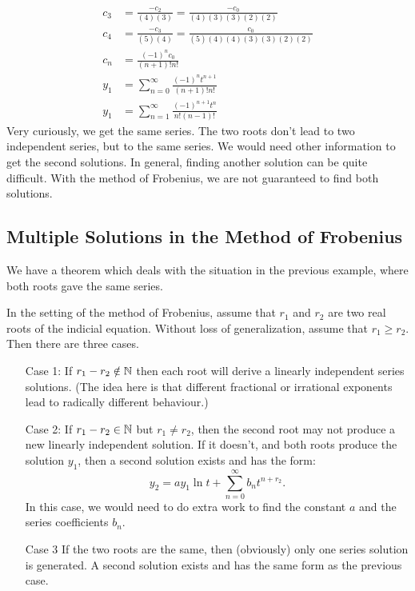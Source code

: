 \documentclass[fleqn,letterpaper]{report}
\begin{document}
\begin{example}
\begin{align*}
c_3 & = \frac{-c_2}{(4)(3)} = \frac{-c_0}{(4)(3)(3)(2)(2)} \\
c_4 & = \frac{-c_3}{(5)(4)} = \frac{c_0}{(5)(4)(4)(3)(3)(2)(2)} \\
c_n & = \frac{(-1)^{n} c_0}{(n+1)! n!} \\
y_1 & = \sum_{n=0}^\infty \frac{(-1)^n t^{n+1}}{(n+1)!n!} \\
y_1 & = \sum_{n=1}^\infty \frac{(-1)^{n+1} t^n}{n!(n-1)!}
\end{align*}
Very curiously, we get the same series. The two roots don't lead to two
independent series, but to the same series. We would need other
information to get the second solutions. In general, finding
another solution can be quite difficult. With the method of
Frobenius, we are not guaranteed to find both solutions.
\end{example}

\subsection{Multiple Solutions in the Method of Frobenius}
\label{frobenius-multiple-solutions}

We have a theorem which deals with the situation in the
previous example, where both roots gave the same series.

\begin{thm}
In the setting of the method of Frobenius, assume that $r_1$
and $r_2$ are two real roots of the indicial equation.
Without loss of generalization, assume that $r_1 \geq r_2$.
Then there are three cases.

\begin{itemize}
\item[Case 1:] If $r_1 - r_2 \notin \mathbb{N}$ then each root will
derive a linearly independent series solutions. (The idea
here is that different fractional or irrational exponents lead
to radically different behaviour.)
\item[Case 2:] If $r_1 - r_2 \in \mathbb{N}$ but $r_1 \neq r_2$, then
the second root may not produce a new linearly independent
solution. If it doesn't, and both roots produce the solution
$y_1$, then a second solution exists and has the form:
\begin{equation*}
y_2 = a y_1 \ln t + \sum_{n=0}^\infty b_n t^{n+r_2}.
\end{equation*}
In this case, we would need to do extra work to find the
constant $a$ and the series coefficients $b_n$.
\item[Case 3] If the two roots are the same, then (obviously)
only one series solution is generated. A second solution
exists and has the same form as the previous case.
\end{itemize}
\end{thm}
\end{document}
